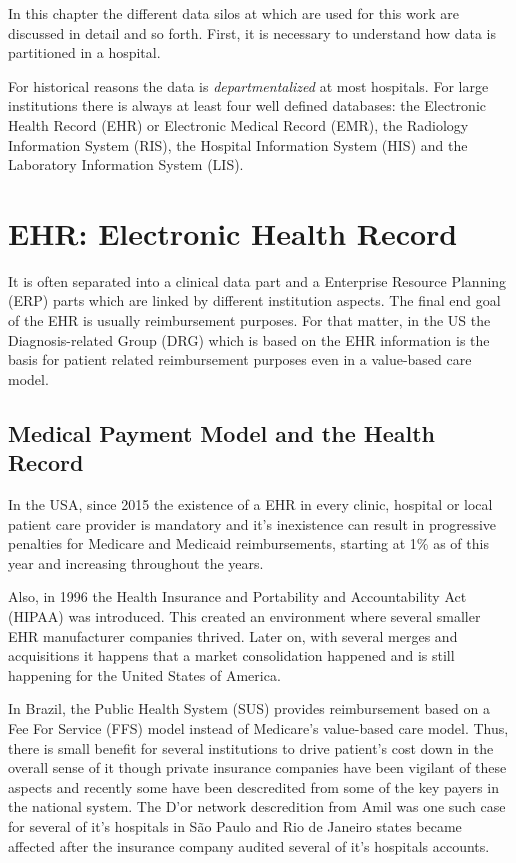 \label{chap:methodology}

In this chapter the different data silos at \nomeHsl{} which are used for this work are discussed in detail and so forth. First, it is necessary to understand how data is partitioned in a hospital. 

For historical reasons the data is \emph{departmentalized} at most hospitals. For large institutions there is always at least four well defined databases: the Electronic Health Record (EHR) or Electronic Medical Record (EMR), the Radiology Information System (RIS), the Hospital Information System (HIS) and the Laboratory Information System (LIS).

\section{EHR: Electronic Health Record}
\label{sec:ehr}

It is often separated into a clinical data part and a Enterprise Resource Planning (ERP) parts which are linked by different institution aspects. The final end goal of the EHR is usually reimbursement purposes. For that matter, in the US the Diagnosis-related Group (DRG) which is based on the EHR information is the basis for patient related reimbursement purposes even in a value-based care model.

\subsection{Medical Payment Model and the Health Record}
\label{sec:ehr_payment}
In the USA, since 2015 the existence of a EHR in every clinic, hospital or local patient care provider is mandatory and it's inexistence can result in progressive penalties for Medicare and Medicaid reimbursements, starting at 1\% as of this year and increasing throughout the years.

Also, in 1996 the Health Insurance and Portability and Accountability Act (HIPAA) was introduced\cite{annasHipaa2003}. This created an environment where several smaller EHR manufacturer companies thrived. Later on, with several merges and acquisitions it happens that a market consolidation happened and is still happening for the United States of America.

In Brazil, the Public Health System (SUS) provides reimbursement based on a Fee For Service (FFS) model instead of Medicare's value-based care model. Thus, there is small benefit for several institutions to drive patient's cost down in the overall sense of it though private insurance companies have been vigilant of these aspects and recently some have been descredited from some of the key payers in the national system. The D'or network descredition from Amil was one such case for several of it's hospitals in São Paulo and Rio de Janeiro states became affected after the insurance company audited several of it's hospitals accounts\cite{amilRedeDor2019}.

